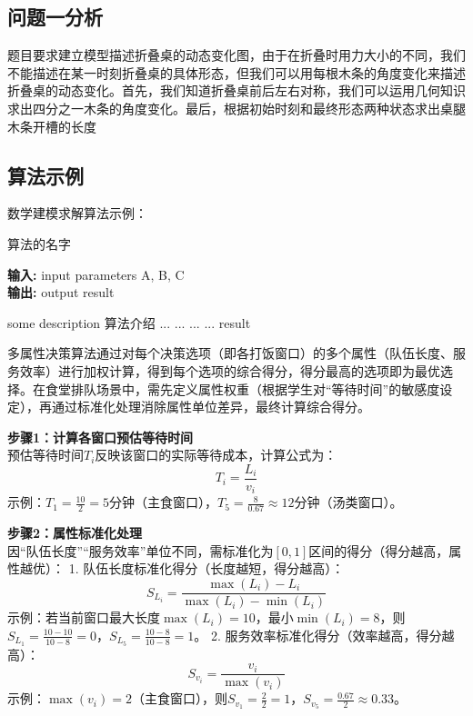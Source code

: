\documentclass[bwprint]{gmcmthesis}
\begin{document}
\subsection{问题一分析}
题目要求建立模型描述折叠桌的动态变化图，由于在折叠时用力大小的不同，我们不能描述在某一时刻折叠桌的具体形态，但我们可以用每根木条的角度变化来描述折叠桌的动态变化。首先，我们知道折叠桌前后左右对称，我们可以运用几何知识求出四分之一木条的角度变化。最后，根据初始时刻和最终形态两种状态求出桌腿木条开槽的长度


\subsection{算法示例}

数学建模求解算法示例：
\begin{center}
\begin{minipage}{0.8\textwidth}
\begin{algorithm}[H]%
\caption{算法的名字} %
{\bf 输入:} %
input parameters A, B, C\\
{\bf 输出:} %
output result
\begin{algorithmic}[1]
\State some description 算法介绍 %
  \State ...
    \State ...
  \Else
    \State ...
  \EndIf
\EndFor
{} %
  \State ...
\EndWhile
\State \Return result
\end{algorithmic}
\end{algorithm}
\end{minipage}
\end{center}
\vspace{2ex}

多属性决策算法通过对每个决策选项（即各打饭窗口）的多个属性（队伍长度、服务效率）进行加权计算，得到每个选项的综合得分，得分最高的选项即为最优选择。在食堂排队场景中，需先定义属性权重（根据学生对“等待时间”的敏感度设定），再通过标准化处理消除属性单位差异，最终计算综合得分。


\textbf{步骤1：计算各窗口预估等待时间} \\
  预估等待时间$T_i$反映该窗口的实际等待成本，计算公式为：
  \[
  T_i = \frac{L_i}{v_i}
  \]
  示例：$T_1 = \frac{10}{2} = 5$分钟（主食窗口），$T_5 = \frac{8}{0.67} \approx 12$分钟（汤类窗口）。

\textbf{步骤2：属性标准化处理} \\
  因“队伍长度”“服务效率”单位不同，需标准化为$[0,1]$区间的得分（得分越高，属性越优）：
  1. 队伍长度标准化得分（长度越短，得分越高）：
     \[
     S_{L_i} = \frac{\max(L_i) - L_i}{\max(L_i) - \min(L_i)}
     \]
     示例：若当前窗口最大长度$\max(L_i)=10$，最小$\min(L_i)=8$，则$S_{L_1} = \frac{10-10}{10-8} = 0$，$S_{L_5} = \frac{10-8}{10-8} = 1$。
  2. 服务效率标准化得分（效率越高，得分越高）：
     \[
     S_{v_i} = \frac{v_i}{\max(v_i)}
     \]
     示例：$\max(v_i)=2$（主食窗口），则$S_{v_1} = \frac{2}{2} = 1$，$S_{v_5} = \frac{0.67}{2} \approx 0.33$。
\end{document}
